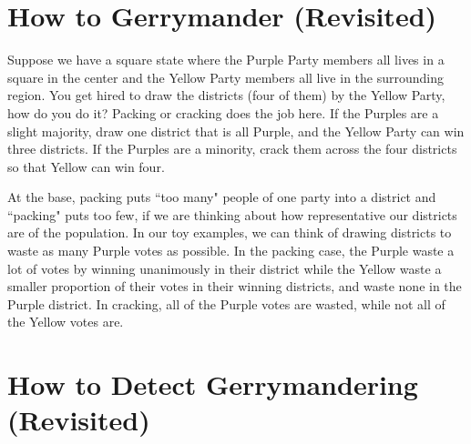 





\section*{How to Gerrymander (Revisited)}

Suppose we have a square state where the Purple Party members all lives in a square in the center and the Yellow Party members all live in the surrounding region.  You get hired to draw the districts (four of them) by the Yellow Party, how do you do it?  Packing or cracking does the job here.  If the Purples are a slight majority, draw one district that is all Purple, and the Yellow Party can win three districts.  If the Purples are a minority, crack them across the four districts so that Yellow can win four.


At the base, packing puts ``too many" people of one party into a district and ``packing" puts too few, if we are thinking about how representative our districts are of the population.  In our toy examples, we can think of drawing districts to waste as many Purple votes as possible.  In the packing case, the Purple waste a lot of votes by winning unanimously in their district while the Yellow waste a smaller proportion of their votes in their winning districts, and waste none in the Purple district.  In cracking, all of the Purple votes are wasted, while not all of the Yellow votes are.


\section*{How to Detect Gerrymandering (Revisited)}


